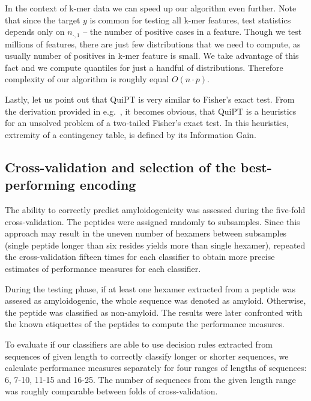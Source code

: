 \documentclass[a4,center,fleqn]{NAR}
\begin{document}
  In the context of k-mer data we can speed up our algorithm even further. Note 
that since the target $y$ is common for testing all k-mer features, test 
statistics depends only on $n_{\cdot, 1}$ -- the number of positive cases in a 
feature. Though we test millions of features, there are just few distributions 
that we need to compute, as usually number of positives in k-mer feature is 
small. We take advantage of this fact and we compute quantiles for just a 
handful of distributions. Therefore complexity of our algorithm is roughly equal 
$O(n\cdot p)$.

  Lastly, let us point out that QuiPT is very similar to Fisher's exact test. 
From the derivation provided in e.g.~\citep{lehmann_testing_2008}, it becomes 
obvious, that QuiPT is a heuristics for an unsolved problem of a two-tailed 
Fisher's exact test. In this heuristics, extremity of a contingency table, is 
defined by its Information Gain.

\subsection{Cross-validation and selection of the best-performing encoding}

The ability to correctly predict amyloidogenicity was assessed during the 
five-fold cross-validation. The peptides were assigned randomly to 
subsamples. Since this approach may result in the uneven number of hexamers 
between subsamples (single peptide longer than six resides yields more than 
single hexamer), repeated the cross-validation fifteen times for each classifier 
to obtain more precise estimates of performance measures for each classifier. 

  During the testing phase, if at least one hexamer extracted from a peptide was 
assesed as amyloidogenic, the whole sequence was denoted as amyloid. Otherwise,
the peptide was classified as non-amyloid. The results were later confronted with 
the known etiquettes of the peptides to compute the performance measures.

  To evaluate if our classifiers are able to use decision rules extracted from 
sequences of given length to correctly classify longer or shorter sequences, we 
calculate performance measures separately for four ranges of lengths of 
sequences: 6, 7-10, 11-15 and 16-25. The number of sequences from the given 
%
%
%
length range was roughly comparable between folds of cross-validation.
  
\end{document}
